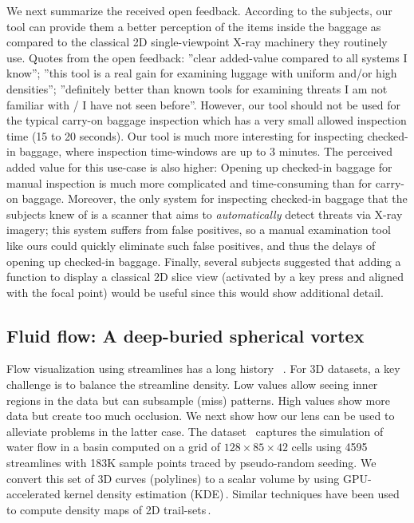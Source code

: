 We next summarize the received open feedback. According to the subjects, our tool can provide them a better perception of the items inside the baggage as compared to the classical 2D single-viewpoint X-ray machinery they routinely use. Quotes from the open feedback: ''clear added-value compared to all systems I know''; ''this tool is a real gain for examining luggage with uniform and/or high densities''; ''definitely better than known tools for examining threats I am not familiar with / I have not seen before''. However, our tool should not be used for the typical carry-on baggage inspection which has a very small allowed inspection time (15 to 20 seconds). Our tool is much more interesting for inspecting checked-in baggage, where inspection time-windows are up to 3 minutes. The perceived added value for this use-case is also higher: Opening up checked-in baggage for manual inspection is much more complicated and time-consuming than for carry-on baggage. Moreover, the only system for inspecting checked-in baggage that the subjects knew of is a scanner that aims to \emph{automatically} detect threats via X-ray imagery; this system suffers from false positives, so a manual examination tool like ours could quickly eliminate such false positives, and thus the delays of opening up checked-in baggage. Finally, several subjects suggested that adding a function to display a classical 2D slice view (activated by a key press and aligned with the focal point) would be useful since this would show additional detail.


\subsection{Fluid flow: A deep-buried spherical vortex}
\label{sec:flow}
%
%
Flow visualization using streamlines has a long history \,\cite{brambilla2012illustrative} \cite{merzkirch2012flow}. For 3D datasets, a key challenge is to balance the streamline density. Low values allow seeing inner regions in the data but can subsample (miss) patterns. High values show more data but create too much occlusion. We next show how our lens can be used to alleviate problems in the latter case. The dataset \, \cite{griebel2004flow} captures the simulation of water flow in a basin computed on a grid of $128 \times 85 \times 42$ cells using 4595 streamlines with 183K sample points traced by pseudo-random seeding. We convert this set of 3D curves (polylines) to a scalar volume by using GPU-accelerated kernel density estimation (KDE)\,\cite{lhuillier2017ffteb}. Similar techniques have been used to compute density maps of 2D trail-sets\,\cite{hurter2012graph,cubu,hurter2015image}. 

